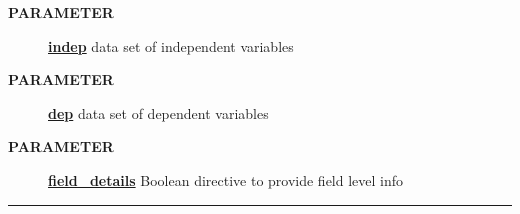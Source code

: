 \par
\begin{description}
\item [\colorbox{tagtype}{\color{white} \textbf{\textsf{PARAMETER}}}] \textbf{\underline{indep}} data set of independent variables
\item [\colorbox{tagtype}{\color{white} \textbf{\textsf{PARAMETER}}}] \textbf{\underline{dep}} data set of dependent variables
\item [\colorbox{tagtype}{\color{white} \textbf{\textsf{PARAMETER}}}] \textbf{\underline{field\_details}} Boolean directive to provide field level info
\end{description}

\rule{\linewidth}{0.5pt}
